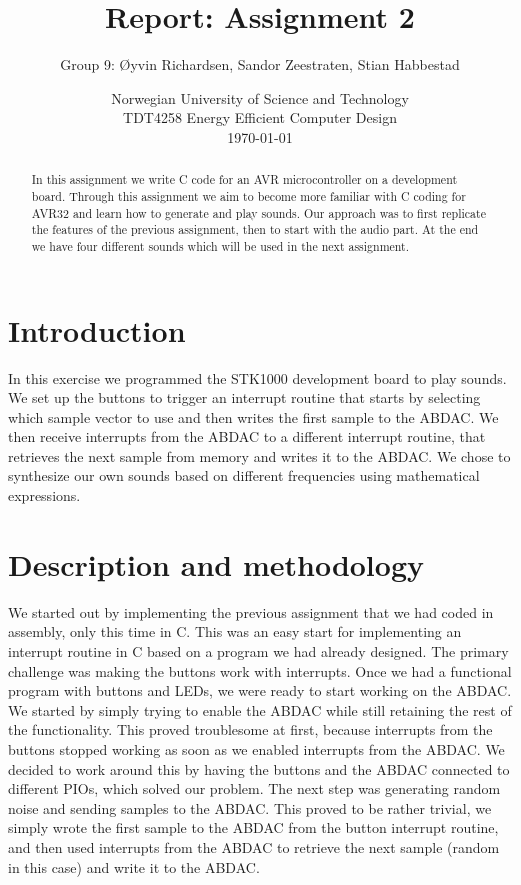\documentclass[a4paper,11pt]{article}
\title{\textbf{Report: Assignment 2}}
\author{Group 9: \O yvin Richardsen, Sandor Zeestraten, Stian Habbestad}
\date{{Norwegian University of Science and Technology \\
TDT4258 Energy Efficient Computer Design \\}
\today}
\begin{document}
\maketitle

\begin{abstract}
In this assignment we write C code for an AVR microcontroller on a development board. Through this assignment we aim to become more familiar with C coding for AVR32 and learn how to generate and play sounds. Our approach was to first replicate the features of the previous assignment, then to start with the audio part. At the end we have four different sounds which will be used in the next assignment.
\end{abstract}

\bigskip
\tableofcontents
\newpage

\section{Introduction}
In this exercise we programmed the STK1000 development board to play sounds. We set up the buttons to trigger an interrupt routine that starts by selecting which sample vector to use and then writes the first sample to the ABDAC. We then receive interrupts from the ABDAC to a different interrupt routine, that retrieves the next sample from memory and writes it to the ABDAC. We chose to synthesize our own sounds based on different frequencies using mathematical expressions. 

\section{Description and methodology}
We started out by implementing the previous assignment that we had coded in assembly, only this time in C. This was an easy start for implementing an interrupt routine in C based on a program we had already designed. The primary challenge was making the buttons work with interrupts. Once we had a functional program with buttons and LEDs, we were ready to start working on the ABDAC. We started by simply trying to enable the ABDAC while still retaining the rest of the functionality. This proved troublesome at first, because interrupts from the buttons stopped working as soon as we enabled interrupts from the ABDAC. We decided to work around this by having the buttons and the ABDAC connected to different PIOs, which solved our problem. The next step was generating random noise and sending samples to the ABDAC. This proved to be rather trivial, we simply wrote the first sample to the ABDAC from the button interrupt routine, and then used interrupts from the ABDAC to retrieve the next sample (random in this case) and write it to the ABDAC.
\end{document}
